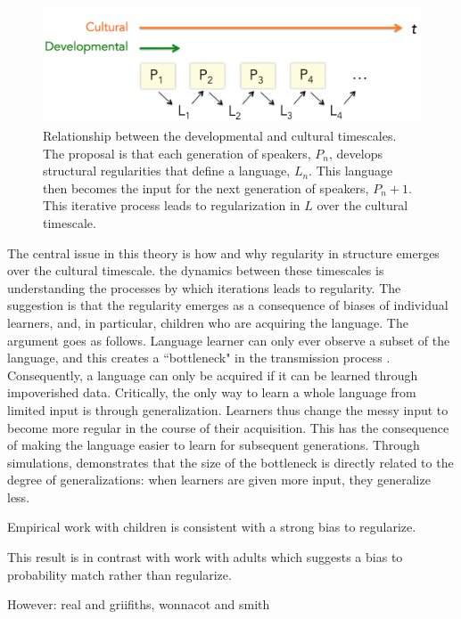 \documentclass[man, noapacite, 12pt]{apa2}
\begin{document}
\begin{figure}
\begin{center} 
\includegraphics[width=6in]{figs/timescales2}
\caption{Relationship between the developmental and cultural timescales. The proposal is that each generation of speakers, $P_n$, develops structural regularities that define a language, $L_n$. This language then becomes the input for the next generation of speakers, $P_n+1$. This iterative process leads to regularization in $L$ over the cultural timescale. }
\end{center} 
\end{figure}

The central issue in this theory is how and why regularity in structure emerges over the cultural timescale. 
the dynamics between these timescales is understanding the processes by which iterations leads to regularity. The suggestion is that the regularity emerges as a consequence of biases of individual learners, and, in particular, children who are acquiring the language. The argument goes as follows. Language learner can only ever observe a subset of the language, and this creates a ``bottleneck" in the transmission process \cite{kirby2007evolution}. Consequently, a language can only be acquired if it can be learned through impoverished data. Critically, the only way to learn a whole language from limited input is through generalization. Learners thus change the messy input to become more  regular in the course of their acquisition. This has the consequence of making the language  easier to learn for subsequent generations. Through simulations,  demonstrates that the size of the bottleneck is directly related to the degree of generalizations: when learners are given more input, they generalize less.

Empirical work with children is consistent with a strong bias to regularize. 

This result is in contrast with work with adults which suggests a bias to probability match rather than regularize.

However: real and griifiths, wonnacot and smith
\end{document}

